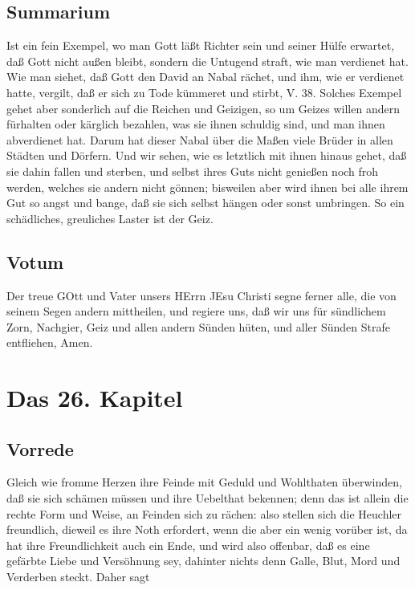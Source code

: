 \section{Summarium}

Ist ein fein Exempel, wo man Gott läßt Richter sein und seiner Hülfe erwartet, daß Gott nicht außen bleibt, sondern die Untugend straft, wie man verdienet hat. Wie man siehet, daß Gott den David an Nabal rächet, und ihm, wie er verdienet hatte, vergilt, daß er sich zu Tode kümmeret und stirbt, V. 38. Solches Exempel gehet aber sonderlich auf die Reichen und Geizigen, so um Geizes willen andern fürhalten oder kärglich bezahlen, was sie ihnen schuldig sind, und man ihnen abverdienet hat. Darum hat dieser Nabal über die Maßen viele Brüder in allen Städten und Dörfern. Und wir sehen, wie es letztlich mit ihnen hinaus gehet, daß sie dahin fallen und sterben, und selbst ihres Guts nicht genießen noch froh werden, welches sie andern nicht gönnen; bisweilen aber wird ihnen bei alle ihrem Gut so angst und bange, daß sie sich selbst hängen oder sonst umbringen. So ein schädliches, greuliches Laster ist der Geiz.

\section{Votum}

Der treue GOtt und Vater unsers HErrn JEsu Christi segne ferner alle, die von seinem Segen andern mittheilen, und regiere uns, daß wir uns für sündlichem Zorn, Nachgier, Geiz und allen andern Sünden hüten, und aller Sünden Strafe entfliehen, Amen.

\chapter{Das 26. Kapitel}

\section{Vorrede}

Gleich wie fromme Herzen ihre Feinde mit Geduld und Wohlthaten überwinden, daß sie sich schämen müssen und ihre Uebelthat bekennen; denn das ist allein die rechte Form und Weise, an Feinden sich zu rächen: also stellen sich die Heuchler freundlich, dieweil es ihre Noth erfordert, wenn die aber ein wenig vorüber ist, da hat ihre Freundlichkeit auch ein Ende, und wird also offenbar, daß es eine gefärbte Liebe und Versöhnung sey, dahinter nichts denn Galle, Blut, Mord und Verderben steckt. Daher sagt

